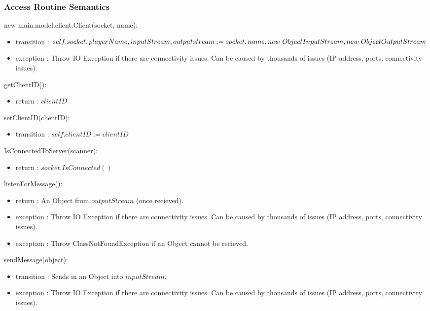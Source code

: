 \documentclass[12pt, titlepage]{article}
\begin{document}
    \subsubsection* {Access Routine Semantics}
    
        \noindent new main.model.client.Client(socket, name):
        \begin{itemize}
        \item transition : $self.socket, playerName, inputStream, outputstream := \\ socket, name, new \hspace{3px} ObjectInputStream, new \hspace{3px} ObjectOutputStream$
        \item exception : Throw IO Exception if there are connectivity issues. Can be caused by thousands of issues (IP address, ports, connectivity issues).
        \end{itemize}
        
        \noindent getClientID():
        \begin{itemize}
        \item return : $clientID$
        \end{itemize}
        
        \noindent setClientID(clientID):
        \begin{itemize}
        \item transition : $self.clientID := clientID$
        \end{itemize}
        
        \noindent IsConnectedToServer(scanner):
        \begin{itemize}
        \item return : $socket.IsConnected()$
        \end{itemize}
        
        \noindent listenForMessage():
        \begin{itemize}
        \item return : An Object from $outputStream$ (once recieved).
        \item exception : Throw IO Exception if there are connectivity issues. Can be caused by thousands of issues (IP address, ports, connectivity issues).
        \item exception : Throw ClassNotFoundException if an Object cannot be recieved.
        \end{itemize}
        
        \noindent sendMessage(object):
        \begin{itemize}
        \item transition : Sends in an Object into $inputStream$.
        \item exception : Throw IO Exception if there are connectivity issues. Can be caused by thousands of issues (IP address, ports, connectivity issues).
        \end{itemize}
        
\end{document}
